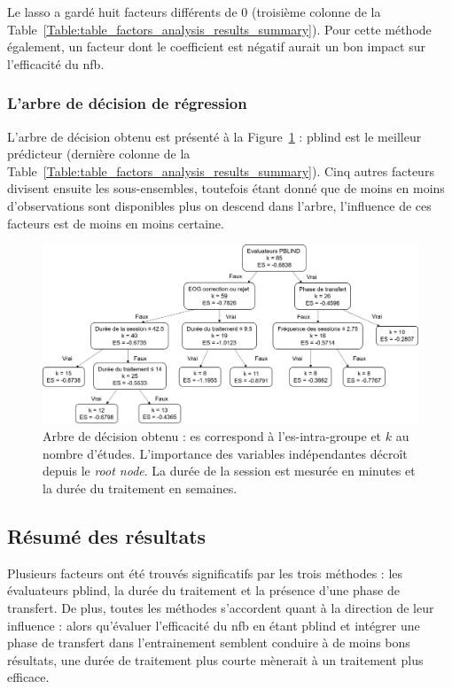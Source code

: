 Le \gls{lasso} a gardé huit facteurs différents de 0 (troisième colonne de la Table~\ref{Table:table_factors_analysis_results_summary}). Pour cette méthode également,
un facteur dont le coefficient est négatif aurait un bon impact sur l'efficacité du \gls{nfb}.

\subsubsection{L'arbre de décision de régression}

L'arbre de décision obtenu est présenté à la Figure~\ref{Figure:factors_decision_tree} : \gls{pblind} est le meilleur prédicteur (dernière colonne de la
Table~\ref{Table:table_factors_analysis_results_summary}). Cinq autres facteurs divisent ensuite les sous-ensembles, toutefois étant donné que de moins
en moins d'observations sont disponibles plus on descend dans l'arbre, l'influence de ces facteurs est de moins en moins certaine.

\begin{figure}[h!]
  \centering
	\includegraphics[width=1\linewidth]{figures/chapter-3/factors-decision-tree} 
  \caption{Arbre de décision obtenu : \gls{es} correspond à l'\gls{es}-intra-groupe et $k$ au nombre d'études. L'importance des variables indépendantes
	décroît depuis le \textit{root node}. La durée de la session est mesurée en minutes et la durée du traitement en semaines.}
  \label{Figure:factors_decision_tree}
\end{figure}

\subsection{Résumé des résultats}

Plusieurs facteurs ont été trouvés significatifs par les trois méthodes : les évaluateurs \gls{pblind}, la durée du traitement et la présence d'une phase de transfert. 
De plus, toutes les méthodes s'accordent quant à la direction de leur influence : alors qu'évaluer l'efficacité du \gls{nfb} en étant \gls{pblind}
et intégrer une phase de transfert dans l'entrainement semblent conduire à de moins bons résultats, une durée de traitement plus courte mènerait à un traitement plus efficace. 

